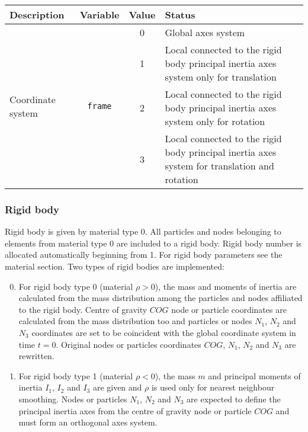 \begin{tabular}{|l|c|c|l|}
\hline
{\bf Description} & {\bf Variable} & {\bf Value} & {\bf Status} \\ \hline
\multirow{7}{1in}{Coordinate system} & \multirow{7}{*}{\texttt{frame}} & 0 & Global axes system \\ \cline{3-4}
& & \multirow{2}{*}{1} & \multirow{2}{3.5in}{Local connected to the rigid body principal inertia axes system only for translation} \\
& & & \\ \cline{3-4}
& & \multirow{2}{*}{2} & \multirow{2}{3.5in}{Local connected to the rigid body principal inertia axes system only for rotation} \\
& & & \\ \cline{3-4}
& & \multirow{2}{*}{3} & \multirow{2}{3.5in}{Local connected to the rigid body principal inertia axes system for translation and rotation} \\
& & & \\ \hline
\end{tabular}

\newpage


\subsubsection{Rigid body}

Rigid body is given by material type 0. All particles and nodes belonging to elements from material type 0 are included to a rigid body. Rigid body number is allocated automatically beginning from 1. For rigid body parameters see the material section. Two types of rigid bodies are implemented:

\begin{enumerate}\setcounter{enumi}{-1}
\item For rigid body type 0 (material $\rho>0$), the mass and moments of inertia are calculated from the mass distribution among the particles and nodes affiliated to the rigid body. Centre of gravity $COG$ node or particle coordinates are calculated from the mass distribution too and particles or nodes $N_1$, $N_2$ and $N_3$ coordinates are set to be coincident with the global coordinate system in time $t=0$. Original nodes or particles coordinates $COG$, $N_1$, $N_2$ and $N_3$ are rewritten.
\item For rigid body type 1 (material $\rho<0$), the mass $m$ and principal moments of inertia $I_1$, $I_2$ and $I_3$ are given and $\rho$ is used only for nearest neighbour smoothing. Nodes or particles $N_1$, $N_2$ and $N_3$ are expected to define the principal inertia axes from the centre of gravity node or particle $COG$ and must form an orthogonal axes system.
\end{enumerate}

